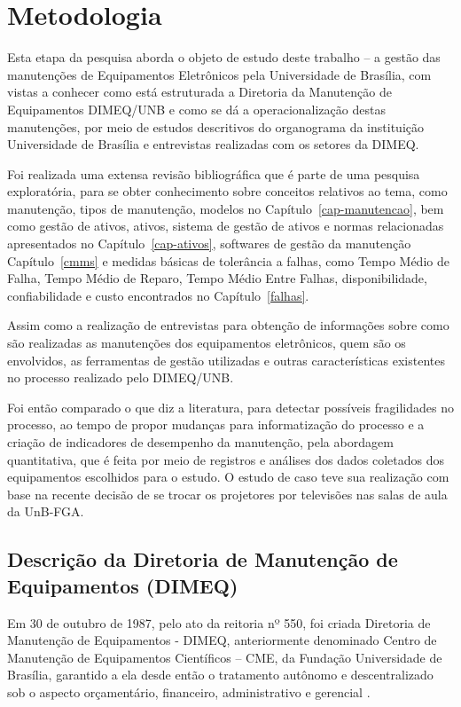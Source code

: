 %

\chapter{Metodologia}

Esta etapa da pesquisa aborda o objeto de estudo deste trabalho – a gestão das manutenções de Equipamentos Eletrônicos pela Universidade de Brasília, com vistas a conhecer como está estruturada a Diretoria da Manutenção de Equipamentos DIMEQ/UNB e como se dá a operacionalização destas manutenções, por meio de estudos descritivos do organograma da instituição Universidade de Brasília e entrevistas realizadas com os setores da DIMEQ.

Foi realizada uma extensa revisão bibliográfica que é parte de uma pesquisa exploratória, para se obter conhecimento sobre conceitos relativos ao tema, como manutenção, tipos de manutenção, modelos no Capítulo~\ref{cap-manutencao}, bem como gestão de ativos, ativos, sistema de gestão de ativos e normas relacionadas apresentados no Capítulo~\ref{cap-ativos}, softwares de gestão da manutenção Capítulo~\ref{cmms} e medidas básicas de tolerância a falhas, como  Tempo Médio de Falha, Tempo Médio de Reparo, Tempo Médio Entre Falhas, disponibilidade, confiabilidade e custo encontrados no Capítulo~\ref{falhas}.

Assim como a realização de entrevistas para obtenção de informações sobre como são realizadas as manutenções dos equipamentos eletrônicos, quem são os envolvidos, as ferramentas de gestão utilizadas e outras características existentes no processo realizado pelo DIMEQ/UNB.

Foi então comparado o que diz a literatura, para detectar possíveis fragilidades no processo, ao tempo de propor mudanças para informatização do processo e a criação de indicadores de desempenho da manutenção, pela abordagem quantitativa, que é feita por meio de registros e análises dos dados coletados dos equipamentos escolhidos para o estudo. O estudo de caso teve sua realização com base na recente decisão de se trocar os projetores por televisões nas salas de aula da UnB-FGA. 

\section{Descrição da Diretoria de Manutenção de Equipamentos (DIMEQ)}

Em 30 de outubro de 1987, pelo ato da reitoria nº 550, foi criada Diretoria de Manutenção de Equipamentos - DIMEQ, anteriormente denominado Centro de Manutenção de Equipamentos Científicos – CME, da Fundação Universidade de Brasília, garantido a ela desde então o tratamento autônomo e descentralizado sob o aspecto orçamentário, financeiro, administrativo e gerencial \cite{dimeq}.


